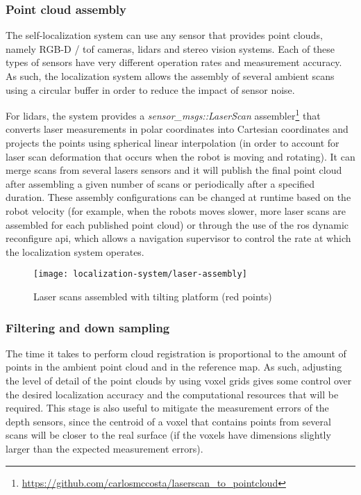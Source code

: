 \subsubsection{Point cloud assembly}

The self-localization system can use any sensor that provides point clouds, namely RGB-D / \gls{tof} cameras, \glspl{lidar} and stereo vision systems. Each of these types of sensors have very different operation rates and measurement accuracy. As such, the localization system allows the assembly of several ambient scans using a circular buffer in order to reduce the impact of sensor noise.

For \glspl{lidar}, the system provides a \emph{sensor\_msgs::LaserScan} assembler\footnote{\url{https://github.com/carlosmccosta/laserscan_to_pointcloud}} that converts laser measurements in polar coordinates into Cartesian coordinates and projects the points using spherical linear interpolation (in order to account for laser scan deformation that occurs when the robot is moving and rotating). It can merge scans from several lasers sensors and it will publish the final point cloud after assembling a given number of scans or periodically after a specified duration. These assembly configurations can be changed at runtime based on the robot velocity (for example, when the robots moves slower, more laser scans are assembled for each published point cloud) or through the use of the \gls{ros} dynamic reconfigure \gls{api}, which allows a navigation supervisor to control the rate at which the localization system operates.


\begin{figure}[hb]
	\centering
	\texttt{[image: localization-system/laser-assembly]}
	\caption{Laser scans assembled with tilting platform (red points)}
	\label{fig:localization-system_section_laser_assembly}
\end{figure}


\subsubsection{Filtering and down sampling}

The time it takes to perform cloud registration is proportional to the amount of points in the ambient point cloud and in the reference map. As such, adjusting the level of detail of the point clouds by using voxel grids gives some control over the desired localization accuracy and the computational resources that will be required. This stage is also useful to mitigate the measurement errors of the depth sensors, since the centroid of a voxel that contains points from several scans will be closer to the real surface (if the voxels have dimensions slightly larger than the expected measurement errors).

